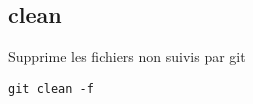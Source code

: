 \subsection*{clean}
Supprime les fichiers non suivis par git
\begin{verbatim}
git clean -f
\end{verbatim}

